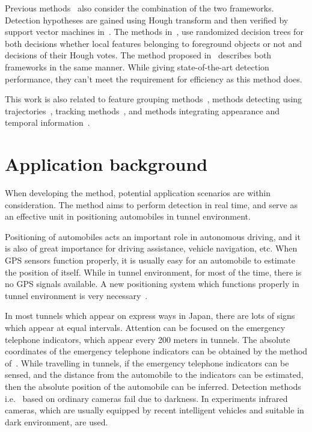 Previous methods~\cite{ac34} also consider the combination of the two frameworks. Detection hypotheses are gained using Hough transform and then verified by support vector machines in~\cite{ac10,ac25}. The methods in~\cite{ac6,ac7}, use randomized decision trees for both decisions whether local features belonging to foreground objects or not and decisions of their Hough votes. The method proposed in~\cite{ac27} describes both frameworks in the same manner. While giving state-of-the-art detection performance, they can't meet the requirement for efficiency as this method does.

 This work is also related to feature grouping methods~\cite{ac25}, methods detecting using trajectories~\cite{my9,ac24}, tracking methods~\cite{my7,my10}, and methods integrating appearance and temporal information~\cite{ac23}.


\section{Application background}
\label{ab}

When developing the method, potential application scenarios are within consideration. The method aims to perform detection in real time, and serve as an effective unit in positioning automobiles in tunnel environment.

Positioning of automobiles acts an important role in autonomous driving, and it is also of great importance for driving assistance, vehicle navigation, etc. When GPS sensors function properly, it is usually easy for an automobile to estimate the position of  itself. While in tunnel environment, for most of the time, there is no GPS signals available. A new positioning system which functions properly in tunnel environment is very necessary~\cite{nig}.

In most tunnels which appear on express ways in Japan, there are lots of signs which appear at equal intervals. Attention can be focused on the emergency telephone indicators, which appear every 200 meters in tunnels. The absolute coordinates of the emergency telephone indicators can be obtained by the method of~\cite{xue}. While travelling in tunnels, if the emergency telephone indicators can be sensed, and the distance from the automobile to the indicators can be estimated, then the absolute position of the automobile can be inferred. Detection methods i.e.~\cite{ac23} based on ordinary cameras fail due to darkness. In experiments infrared cameras, which are usually equipped by recent intelligent vehicles and  suitable in dark environment, are used. 
 
